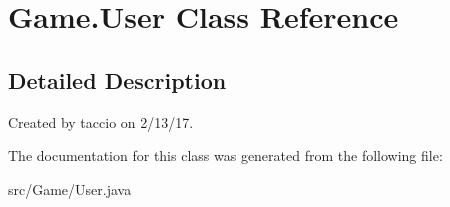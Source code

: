 \hypertarget{classGame_1_1User}{\section{Game.\-User Class Reference}
\label{classGame_1_1User}
}


\subsection{Detailed Description}
Created by taccio on 2/13/17. 

The documentation for this class was generated from the following file\-:\begin{DoxyCompactItemize}
\item 
src/\-Game/User.\-java\end{DoxyCompactItemize}
